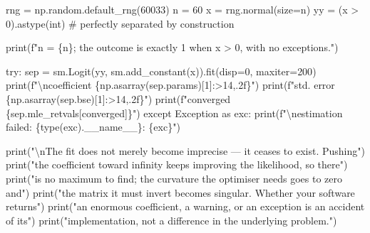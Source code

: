 \documentclass[
  letterpaper,
  10pt,
  twoside,
  openright,
  numbers=noenddot,
  chapterprefix=true]{scrbook}
\newenvironment{Shaded}{}{}
\newcommand{\BuiltInTok}[1]{\textcolor[rgb]{0.84,0.23,0.29}{#1}}
\newcommand{\CharTok}[1]{\textcolor[rgb]{0.01,0.18,0.38}{#1}}
\newcommand{\CommentTok}[1]{\textcolor[rgb]{0.42,0.45,0.49}{#1}}
\newcommand{\ControlFlowTok}[1]{\textcolor[rgb]{0.84,0.23,0.29}{#1}}
\newcommand{\DecValTok}[1]{\textcolor[rgb]{0.00,0.36,0.77}{#1}}
\newcommand{\ImportTok}[1]{\textcolor[rgb]{0.01,0.18,0.38}{#1}}
\newcommand{\NormalTok}[1]{\textcolor[rgb]{0.14,0.16,0.18}{#1}}
\newcommand{\OperatorTok}[1]{\textcolor[rgb]{0.14,0.16,0.18}{#1}}
\newcommand{\PreprocessorTok}[1]{\textcolor[rgb]{0.84,0.23,0.29}{#1}}
\newcommand{\SpecialCharTok}[1]{\textcolor[rgb]{0.00,0.36,0.77}{#1}}
\newcommand{\SpecialStringTok}[1]{\textcolor[rgb]{0.01,0.18,0.38}{#1}}
\newcommand{\StringTok}[1]{\textcolor[rgb]{0.01,0.18,0.38}{#1}}
\newcommand{\VariableTok}[1]{\textcolor[rgb]{0.89,0.38,0.04}{#1}}
\begin{document}
\label{check-separation}
\begin{Shaded}
\begin{Highlighting}[]
\NormalTok{rng }\OperatorTok{=}\NormalTok{ np.random.default\_rng(}\DecValTok{60033}\NormalTok{)}
\NormalTok{n }\OperatorTok{=} \DecValTok{60}
\NormalTok{x }\OperatorTok{=}\NormalTok{ rng.normal(size}\OperatorTok{=}\NormalTok{n)}
\NormalTok{yy }\OperatorTok{=}\NormalTok{ (x }\OperatorTok{\textgreater{}} \DecValTok{0}\NormalTok{).astype(}\BuiltInTok{int}\NormalTok{)          }\CommentTok{\# perfectly separated by construction}

\BuiltInTok{print}\NormalTok{(}\SpecialStringTok{f"n = }\SpecialCharTok{\{}\NormalTok{n}\SpecialCharTok{\}}\SpecialStringTok{;  the outcome is exactly 1 when x \textgreater{} 0, with no exceptions."}\NormalTok{)}

\ControlFlowTok{try}\NormalTok{:}
\NormalTok{    sep }\OperatorTok{=}\NormalTok{ sm.Logit(yy, sm.add\_constant(x)).fit(disp}\OperatorTok{=}\DecValTok{0}\NormalTok{, maxiter}\OperatorTok{=}\DecValTok{200}\NormalTok{)}
    \BuiltInTok{print}\NormalTok{(}\SpecialStringTok{f"}\CharTok{\textbackslash{}n}\SpecialStringTok{coefficient   }\SpecialCharTok{\{}\NormalTok{np}\SpecialCharTok{.}\NormalTok{asarray(sep.params)[}\DecValTok{1}\NormalTok{]}\SpecialCharTok{:\textgreater{}14,.2f\}}\SpecialStringTok{"}\NormalTok{)}
    \BuiltInTok{print}\NormalTok{(}\SpecialStringTok{f"std. error    }\SpecialCharTok{\{}\NormalTok{np}\SpecialCharTok{.}\NormalTok{asarray(sep.bse)[}\DecValTok{1}\NormalTok{]}\SpecialCharTok{:\textgreater{}14,.2f\}}\SpecialStringTok{"}\NormalTok{)}
    \BuiltInTok{print}\NormalTok{(}\SpecialStringTok{f"converged     }\SpecialCharTok{\{}\NormalTok{sep}\SpecialCharTok{.}\NormalTok{mle\_retvals[}\StringTok{\textquotesingle{}converged\textquotesingle{}}\NormalTok{]}\SpecialCharTok{\}}\SpecialStringTok{"}\NormalTok{)}
\ControlFlowTok{except} \PreprocessorTok{Exception} \ImportTok{as}\NormalTok{ exc:}
    \BuiltInTok{print}\NormalTok{(}\SpecialStringTok{f"}\CharTok{\textbackslash{}n}\SpecialStringTok{estimation failed: }\SpecialCharTok{\{}\BuiltInTok{type}\NormalTok{(exc)}\SpecialCharTok{.}\VariableTok{\_\_name\_\_}\SpecialCharTok{\}}\SpecialStringTok{: }\SpecialCharTok{\{}\NormalTok{exc}\SpecialCharTok{\}}\SpecialStringTok{"}\NormalTok{)}

\BuiltInTok{print}\NormalTok{(}\StringTok{"}\CharTok{\textbackslash{}n}\StringTok{The fit does not merely become imprecise — it ceases to exist. Pushing"}\NormalTok{)}
\BuiltInTok{print}\NormalTok{(}\StringTok{"the coefficient toward infinity keeps improving the likelihood, so there"}\NormalTok{)}
\BuiltInTok{print}\NormalTok{(}\StringTok{"is no maximum to find; the curvature the optimiser needs goes to zero and"}\NormalTok{)}
\BuiltInTok{print}\NormalTok{(}\StringTok{"the matrix it must invert becomes singular. Whether your software returns"}\NormalTok{)}
\BuiltInTok{print}\NormalTok{(}\StringTok{"an enormous coefficient, a warning, or an exception is an accident of its"}\NormalTok{)}
\BuiltInTok{print}\NormalTok{(}\StringTok{"implementation, not a difference in the underlying problem."}\NormalTok{)}


\end{Highlighting}
\end{Shaded}
\end{document}
